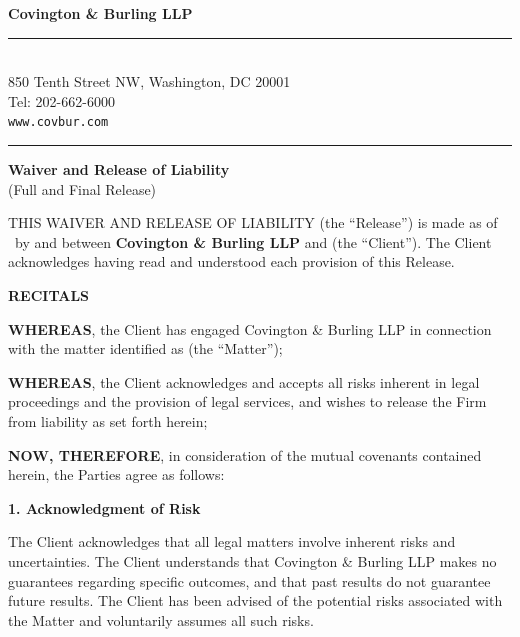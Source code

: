 \documentclass[11pt,letterpaper]{article}
\newcommand{\letterhead}{%
  \begin{center}
    \textcolor{DarkNavy}{\Huge \textbf{Covington \& Burling LLP}} \\[2pt]
    \textcolor{MutedGold}{\rule{0.6\textwidth}{0.5pt}} \\[4pt]
    \textcolor{DarkNavy!70!black}{\small 850 Tenth Street NW, Washington, DC 20001 \\
    Tel: 202-662-6000 \\
    \texttt{www.covbur.com}}
  \end{center}
  \vspace{0.4cm}
  \textcolor{MutedGold}{\rule{\textwidth}{1pt}}
  \vspace{0.3cm}
}
\begin{document}

\letterhead

\begin{center}
  \vspace{0.2cm}
  \textcolor{DarkNavy}{\LARGE \textbf{Waiver and Release of Liability}} \\[4pt]
  \textcolor{DarkNavy!60!black}{\large (Full and Final Release)}
\end{center}
\vspace{0.3cm}

\noindent THIS WAIVER AND RELEASE OF LIABILITY (the ``Release'') is made as of
\EffectiveDate\ by and between \textbf{Covington \& Burling LLP} and
\textbf{\ClientName} (the ``Client''). The Client acknowledges having read
and understood each provision of this Release.

\vspace{0.4cm}
\noindent \textcolor{DarkNavy}{\large \textbf{RECITALS}}

\vspace{0.2cm}
\noindent \textcolor{DarkNavy!70!black}{\textbf{WHEREAS}}, the Client has
engaged Covington \& Burling LLP in connection with the matter identified as
\textbf{\MatterName} (the ``Matter'');

\noindent \textcolor{DarkNavy!70!black}{\textbf{WHEREAS}}, the Client
acknowledges and accepts all risks inherent in legal proceedings and the
provision of legal services, and wishes to release the Firm from liability as
set forth herein;

\noindent \textcolor{DarkNavy!70!black}{\textbf{NOW, THEREFORE}}, in
consideration of the mutual covenants contained herein, the Parties agree as
follows:

\vspace{0.4cm}
\noindent \textcolor{DarkNavy}{\large \textbf{1. Acknowledgment of Risk}}

\noindent The Client acknowledges that all legal matters involve inherent risks
and uncertainties. The Client understands that Covington \& Burling LLP makes
no guarantees regarding specific outcomes, and that past results do not
guarantee future results. The Client has been advised of the potential risks
associated with the Matter and voluntarily assumes all such risks.
\end{document}
